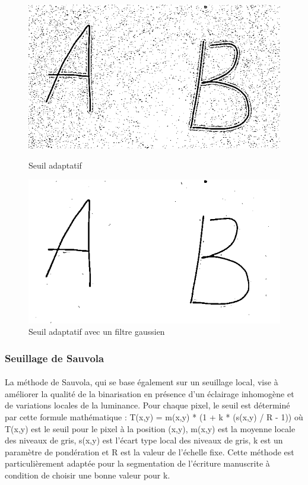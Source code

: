 \documentclass[a4paper]{article}
\begin{document}
				\begin{figure}
					\centering
					\begin{minipage}{.5\textwidth}
					  \centering
					  \includegraphics[width=.8\linewidth]{seuilAdaptatif.png}
					  \caption{Seuil adaptatif}
					  \label{fig:seuillageAdaptatif}
					\end{minipage}%
					\begin{minipage}{.5\textwidth}
					  \centering
					  \includegraphics[width=.8\linewidth]{seuilAdaptatifGauss.png}
					  \caption{Seuil adaptatif avec un filtre gaussien}
					  \label{fig:seuillageAdaptatifEtGauss}
					\end{minipage}
				\end{figure}


				

				\subsubsection{Seuillage de Sauvola}
				\paragraph{} La méthode de Sauvola, qui se base également sur un seuillage local, vise à améliorer la qualité de la binarisation en présence d'un éclairage inhomogène et de variations locales de la luminance. Pour chaque pixel, le seuil est déterminé par cette formule mathématique :
							T(x,y) = m(x,y) * (1 + k * (s(x,y) / R - 1))
				où T(x,y) est le seuil pour le pixel à la position (x,y), m(x,y) est la moyenne locale des niveaux de gris, s(x,y) est l'écart type local des niveaux de gris, k est un paramètre de pondération et R est la valeur de l'échelle fixe.
				Cette méthode est particulièrement adaptée pour la segmentation de l'écriture manuscrite à condition de choisir une bonne valeur pour k. 
\end{document}

